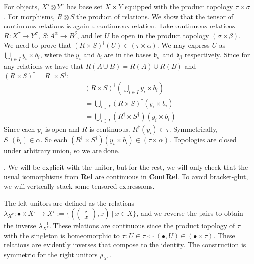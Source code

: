  For objects, $X^\tau \otimes Y^\sigma$ has base set $X \times Y$ equipped with the product topology $\tau \times \sigma$. For morphisms, $R \otimes S$ the product of relations. We show that the tensor of continuous relations is again a continuous relation. Take continuous relations $R: X^\tau \rightarrow Y^\sigma$, $S: A^\alpha \rightarrow B^\beta$, and let $U$ be open in the product topology $(\sigma \times \beta)$. We need to prove that $(R \times S)^\dag(U) \in (\tau \times \alpha)$. We may express $U$ as $\bigcup\limits_{i \in I} y_i \times b_i$, where the $y_i$ and $b_i$ are in the bases $\mathfrak{b}_\sigma$ and $\mathfrak{b}_\beta$ respectively. Since for any relations we have that $R(A \cup B) = R(A) \cup R(B)$ and $(R \times S)^\dag = R^\dag \times S^\dag$:
\begin{align*}
&(R \times S)^\dag(\bigcup\limits_{i \in I} y_i \times b_i)\\
 &= \bigcup\limits_{i \in I}(R \times S)^\dag(y_i \times b_i)\\
 &= \bigcup\limits_{i \in I}(R^\dag \times S^\dag)(y_i \times b_i)
 \end{align*}
Since each $y_i$ is open and $R$ is continuous, $R^\dag(y_i) \in \tau$. Symmetrically, $S^\dag(b_i) \in \alpha$. So each $(R^\dag \times S^\dag)(y_i \times b_i) \in (\tau \times \alpha)$. Topologies are closed under arbitrary union, so we are done.

. We will be explicit with the unitor, but for the rest, we will only check that the usual isomorphisms from \textbf{Rel} are continuous in \textbf{ContRel}. To avoid bracket-glut, we will vertically stack some tensored expressions.

 The left unitors are defined as the relations $\lambda_{X^{\tau}}: \bullet \times X^\tau \rightarrow X^\tau := \{(\begin{pmatrix}\star \\x \end{pmatrix}, x) \ | \ x \in X\}$, and we reverse the pairs to obtain the inverse $\lambda^{-1}_{X^{\tau}}$. These relations are continuous since the product topology of $\tau$ with the singleton is homeomorphic to $\tau$: $U \in \tau \iff (\bullet,U) \in (\bullet \times \tau)$. These relations are evidently inverses that compose to the identity. The construction is symmetric for the right unitors $\rho_{X^{\tau}}$.

